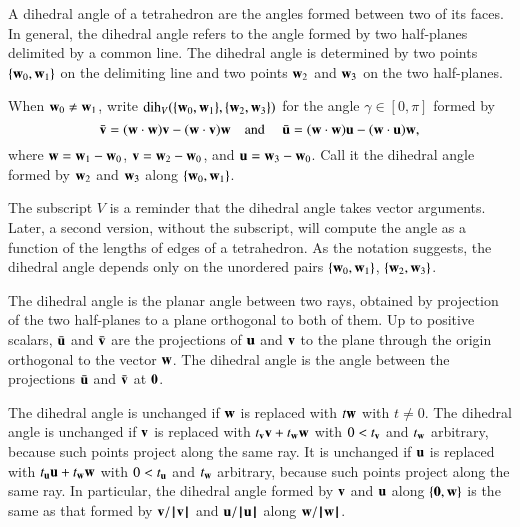 A dihedral angle of a tetrahedron are the angles formed between two of
its faces. In general, the dihedral angle refers to the angle formed
by two half-planes delimited by a common line.  The dihedral angle is
determined by two points $\{{\mathbf w}_0,{\mathbf w}_1\}$ on the delimiting line and
two points ${\mathbf w}_2$ and ${\mathbf w}_3$ on the two half-planes.
%
%
%
%
%

\begin{definition}\label{def:dih} When ${\mathbf w}_0\ne {\mathbf w}_1$,
  write $\operatorname{dih}_V(\{{\mathbf w}_0,{\mathbf w}_1\},\{{\mathbf w}_2,{\mathbf w}_3\})$ for the angle
  $\gamma\in[0,\pi]$ formed by
\begin{displaymath}
\bar {{\mathbf v}} = ({\mathbf w}\cdot {\mathbf w}) {\mathbf v} - ({\mathbf w}\cdot {\mathbf v}) {\mathbf w}\quad\text{and }\quad \bar {{\mathbf u}} =
({\mathbf w}\cdot {\mathbf w}) {\mathbf u} - ({\mathbf w}\cdot {\mathbf u}) {\mathbf w},
\end{displaymath}
where ${\mathbf w}={\mathbf w}_1-{\mathbf w}_0$, ${\mathbf v} = {\mathbf w}_2-{\mathbf w}_0$,  and ${\mathbf u}={\mathbf w}_3-{\mathbf w}_0$.  Call it
the dihedral angle formed by ${\mathbf w}_2$ and ${\mathbf w}_3$ along $\{{\mathbf w}_0,{\mathbf w}_1\}$.
%
%
\end{definition}
The subscript $V$ is a reminder 
that the dihedral angle takes vector arguments.
Later, a second version, without the subscript, will
compute the angle as a function of the lengths of edges of a 
tetrahedron.
%
%
As the notation suggests, the dihedral angle depends only
on the unordered pairs $\{{\mathbf w}_0,{\mathbf w}_1\}$, $\{{\mathbf w}_2,{\mathbf w}_3\}$.

The dihedral angle is the planar angle between two rays, obtained by
projection of the two half-planes to a plane orthogonal to both of
them.  Up to positive scalars, $\bar {{\mathbf u}}$ and $\bar {{\mathbf v}}$ are the
projections of ${\mathbf u}$ and ${\mathbf v}$ to the plane through the origin
orthogonal to the vector ${\mathbf w}$.  The dihedral angle is the angle
between the projections $\bar {{\mathbf u}}$ and $\bar {{\mathbf v}}$ at ${\mathbf 0}$.

\begin{remark}\label{rem:dih}
  The dihedral angle is unchanged if ${\mathbf w}$ is replaced with $t {\mathbf w}$ with
  $t\ne0$. The dihedral angle is unchanged if ${\mathbf v}$ is replaced with
  $t_{\mathbf v} {\mathbf v} + t_{\mathbf w} {\mathbf w}$ with $0 < t_{\mathbf v}$ and $t_{\mathbf w}$ arbitrary, because
  such points project along the same ray.  It is unchanged if ${\mathbf u}$ is
  replaced with $t_{\mathbf u} {\mathbf u} + t_{\mathbf w} {\mathbf w}$ with $0 < t_{\mathbf u}$ and $t_{\mathbf w}$
  arbitrary, because such points project along the same ray.  In
  particular, the dihedral angle formed by ${\mathbf v}$ and ${\mathbf u}$ along
  $\{{\mathbf 0},{\mathbf w}\}$ is the same as that formed by ${\mathbf v}/{{\hskip0.1em|\hskip-0.15em|\hskip0.1em}{\mathbf v}{\hskip0.1em|\hskip-0.15em|\hskip0.1em}}$ and
  ${\mathbf u}/{{\hskip0.1em|\hskip-0.15em|\hskip0.1em}{\mathbf u}{\hskip0.1em|\hskip-0.15em|\hskip0.1em}}$ along ${\mathbf w}/{{\hskip0.1em|\hskip-0.15em|\hskip0.1em}{\mathbf w}{\hskip0.1em|\hskip-0.15em|\hskip0.1em}}$.
\end{remark}

